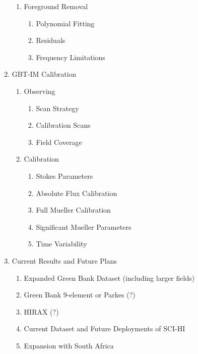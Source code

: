 \documentclass[12pt,twoside]{report}
\begin{document}
\begin{enumerate}
\begin{enumerate}
\item Foreground Removal

\begin{enumerate}
\item Polynomial Fitting
\item Residuals
\item Frequency Limitations
\end{enumerate}

\end{enumerate}

\item GBT-IM Calibration 

\begin{enumerate}
\item Observing

\begin{enumerate}
\item Scan Strategy
\item Calibration Scans
\item Field Coverage
\end{enumerate}

\item Calibration

\begin{enumerate}
\item Stokes Parameters
\item Absolute Flux Calibration
\item Full Mueller Calibration
\item Significant Mueller Parameters
\item Time Variability
\end{enumerate}

\end{enumerate}

\item Current Results and Future Plans

\begin{enumerate}
\item Expanded Green Bank Dataset (including larger fields)
\item Green Bank 9-element or Parkes (?)
\item HIRAX (?)
\item Current Dataset and Future Deployments of SCI-HI
\item Expansion with South Africa
\end{enumerate}

\end{enumerate}
\end{document}

